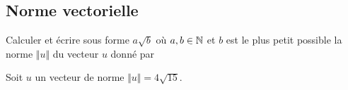 \subsection{Norme vectorielle}

\begin{frame}{3}

	Calculer et écrire sous forme $a\sqrt{b}$ où $a, b\in\mathbb{N}$ et $b$ est le plus petit possible la norme $\Vert u \Vert$ du vecteur $u$ donné par
		
	\boxAB{
		\[ u = \begin{pmatrix} -4 \\ 2 \end{pmatrix}. \]
	}{
		\[ u = \begin{pmatrix}  3 \\ -6 \end{pmatrix}. \]
	}
\end{frame}

\begin{frame}{4}

	Soit $u$ un vecteur de norme $\Vert u \Vert = 4\sqrt{15}$.
	
\end{frame}


